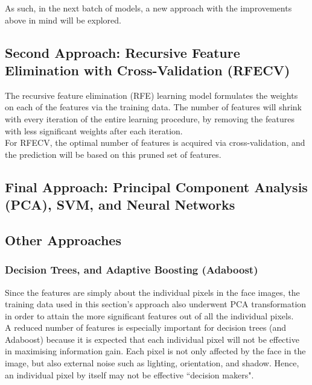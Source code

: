 \documentclass{article}
\begin{document}
As such, in the next batch of models, a new approach with the improvements above in mind will be explored.
\newpage

\subsection{Second Approach: Recursive Feature Elimination with Cross-Validation (RFECV)}
The recursive feature elimination (RFE) learning model formulates the weights on each of the features via the training data. The number of features will shrink with every iteration of the entire learning procedure, by removing the features with less significant weights after each iteration. \\

For RFECV, the optimal number of features is acquired via cross-validation, and the prediction will be based on this pruned set of features. \\

\newpage

\subsection{Final Approach: Principal Component Analysis (PCA), SVM, and Neural Networks}
\label{sec:3.3}
\newpage

\subsection{Other Approaches}
\subsubsection{Decision Trees, and Adaptive Boosting (Adaboost)}
Since the features are simply about the individual pixels in the face images, the training data used in this section's approach also underwent PCA transformation in order to attain the more significant features out of all the individual pixels. \\

A reduced number of features is especially important for decision trees (and Adaboost) because it is expected that each individual pixel will not be effective in maximising information gain. Each pixel is not only affected by the face in the image, but also external noise such as lighting, orientation, and shadow. Hence, an individual pixel by itself may not be effective ``decision makers". \\
\end{document}
